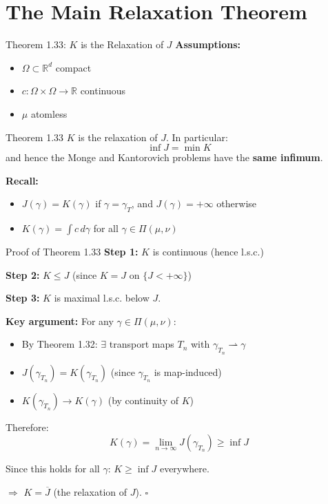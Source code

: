 \documentclass[aspectratio=169]{beamer}
\newcommand{\R}{\mathbb{R}}
\begin{document}
\section{The Main Relaxation Theorem}

\begin{frame}{Theorem 1.33: $K$ is the Relaxation of $J$}
\textbf{Assumptions:}
\begin{itemize}
    \item $\Omega \subset \R^d$ compact
    \item $c : \Omega \times \Omega \to \R$ continuous
    \item $\mu$ atomless
\end{itemize}

\begin{block}{Theorem 1.33}
$K$ is the relaxation of $J$. In particular:
\[
\boxed{\inf J = \min K}
\]
and hence the Monge and Kantorovich problems have the \textbf{same infimum}.
\end{block}

\vspace{0.3cm}
\textbf{Recall:}
\begin{itemize}
    \item $J(\gamma) = K(\gamma)$ if $\gamma = \gamma_T$, and $J(\gamma) = +\infty$ otherwise
    \item $K(\gamma) = \int c \, d\gamma$ for all $\gamma \in \Pi(\mu, \nu)$
\end{itemize}
\end{frame}

\begin{frame}{Proof of Theorem 1.33}
\textbf{Step 1:} $K$ is continuous (hence l.s.c.)

\textbf{Step 2:} $K \leq J$ (since $K = J$ on $\{J < +\infty\}$)

\textbf{Step 3:} $K$ is maximal l.s.c. below $J$.

\vspace{0.3cm}
\textbf{Key argument:} For any $\gamma \in \Pi(\mu, \nu)$:
\begin{itemize}
    \item By Theorem 1.32: $\exists$ transport maps $T_n$ with $\gamma_{T_n} \rightharpoonup \gamma$
    \item $J(\gamma_{T_n}) = K(\gamma_{T_n})$ (since $\gamma_{T_n}$ is map-induced)
    \item $K(\gamma_{T_n}) \to K(\gamma)$ (by continuity of $K$)
\end{itemize}

\vspace{0.2cm}
Therefore:
\[
K(\gamma) = \lim_{n \to \infty} J(\gamma_{T_n}) \geq \inf J
\]

Since this holds for all $\gamma$: $K \geq \inf J$ everywhere.

$\Rightarrow$ $K = \overline{J}$ (the relaxation of $J$). \hfill $\square$
\end{frame}
\end{document}
